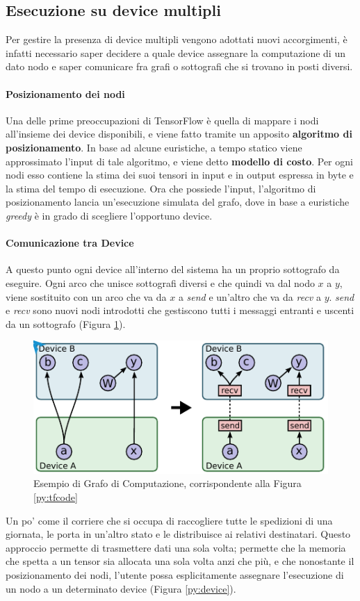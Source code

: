 \documentclass[DIV=calc, paper=a4, fontsize=11pt]{scrartcl}	 %
\begin{document}
\begin{multicols}{2}
			\subsection{Esecuzione su device multipli}
				Per gestire la presenza di device multipli vengono adottati nuovi accorgimenti, è infatti necessario saper decidere a quale device assegnare la computazione di un dato nodo e saper comunicare fra grafi o sottografi che si trovano in posti diversi.
				\paragraph*{Posizionamento dei nodi}\label{paragaph:partition} Una delle prime preoccupazioni di TensorFlow è quella di mappare i nodi all'insieme dei device disponibili, e viene fatto tramite un apposito \textbf{algoritmo di posizionamento}. In base ad alcune euristiche, a tempo statico viene approssimato l'input di tale algoritmo, e viene detto \textbf{modello di costo}. Per ogni nodi esso contiene la stima dei suoi tensori in input e in output espressa in byte e la stima del tempo di esecuzione. Ora che possiede l'input, l'algoritmo di posizionamento lancia un'esecuzione simulata del grafo, dove in base a euristiche \textit{greedy} è in grado di scegliere l'opportuno device.
				\paragraph{Comunicazione tra Device}\label{paragraph:communication} A questo punto ogni device all'interno del sistema ha un proprio sottografo da eseguire. Ogni arco che unisce sottografi diversi e che quindi va dal nodo $x$ a $y$, viene sostituito con un arco che va da $x$ a \textit{send} e un'altro che va da \textit{recv} a $y$. \textit{send} e \textit{recv} sono nuovi nodi introdotti che gestiscono tutti i messaggi entranti e uscenti da un sottografo (Figura \ref{fig:send-recv}).
				\begin{figure}[H]
					\centering
					\includegraphics[scale=.75]{img/send-recv.png}
					\caption{Esempio di Grafo di Computazione, corrispondente alla Figura \ref{py:tfcode}}
					\label{fig:send-recv}
				\end{figure}
				Un po' come il corriere che si occupa di raccogliere tutte le spedizioni di una giornata, le porta in un'altro stato e le distribuisce ai relativi destinatari. Questo approccio permette di trasmettere dati una sola volta; permette che la memoria che spetta a un tensor sia allocata una sola volta anzi che più, e che nonostante il posizionamento dei nodi, l'utente possa esplicitamente assegnare l'esecuzione di un nodo a un determinato device (Figura \ref{py:device}).

\end{multicols}
\end{document}
